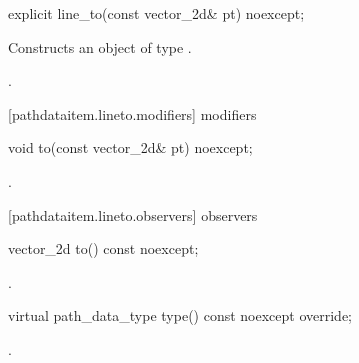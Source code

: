 \begin{itemdecl}
    explicit line_to(const vector_2d& pt) noexcept;
\end{itemdecl}
\begin{itemdescr}
	\pnum
	\effects
	Constructs an object of type .
	
	\pnum
	\postconditions
	.
\end{itemdescr}

 [pathdataitem.lineto.modifiers]{ modifiers}

\begin{itemdecl}
    void to(const vector_2d& pt) noexcept;
\end{itemdecl}
\begin{itemdescr}
	\pnum
	\postconditions
	.
\end{itemdescr}

 [pathdataitem.lineto.observers]{ observers}

\begin{itemdecl}
    vector_2d to() const noexcept;
\end{itemdecl}
\begin{itemdescr}
	\pnum
	\returns
	.
\end{itemdescr}

\begin{itemdecl}
    virtual path_data_type type() const noexcept override;
\end{itemdecl}
\begin{itemdescr}
	\pnum
	\returns
	.
\end{itemdescr}
